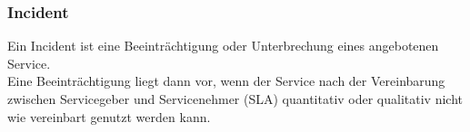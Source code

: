 \documentclass[asp1.tex]{subfiles}
\begin{document}
\subsubsection{Incident}
Ein Incident ist eine Beeinträchtigung oder Unterbrechung eines angebotenen Service. \\
Eine Beeinträchtigung liegt dann vor, wenn der Service nach der Vereinbarung zwischen Servicegeber und Servicenehmer (SLA) quantitativ oder qualitativ nicht wie vereinbart genutzt werden kann.
\end{document}
